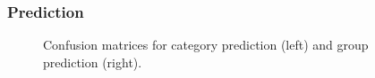 \subsubsection{Prediction}

\begin{figure}[!htbp]
    \caption{Confusion matrices for category prediction (left) and group prediction (right).}
    \label{fig:ch4-scnconfumat}
\end{figure}

